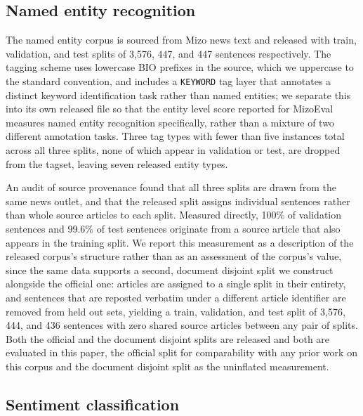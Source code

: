 \documentclass[pdflatex,sn-mathphys-ay]{sn-jnl}
\begin{document}
\subsection{Named entity recognition}
\label{sec:ner-data}

The named entity corpus is sourced from Mizo news text and released with train, validation, and test splits of 3,576, 447, and 447 sentences respectively. The tagging scheme uses lowercase BIO prefixes in the source, which we uppercase to the standard convention, and includes a \texttt{KEYWORD} tag layer that annotates a distinct keyword identification task rather than named entities; we separate this into its own released file so that the entity level score reported for MizoEval measures named entity recognition specifically, rather than a mixture of two different annotation tasks. Three tag types with fewer than five instances total across all three splits, none of which appear in validation or test, are dropped from the tagset, leaving seven released entity types.

An audit of source provenance found that all three splits are drawn from the same news outlet, and that the released split assigns individual sentences rather than whole source articles to each split. Measured directly, 100\% of validation sentences and 99.6\% of test sentences originate from a source article that also appears in the training split. We report this measurement as a description of the released corpus's structure rather than as an assessment of the corpus's value, since the same data supports a second, document disjoint split we construct alongside the official one: articles are assigned to a single split in their entirety, and sentences that are reposted verbatim under a different article identifier are removed from held out sets, yielding a train, validation, and test split of 3,576, 444, and 436 sentences with zero shared source articles between any pair of splits. Both the official and the document disjoint splits are released and both are evaluated in this paper, the official split for comparability with any prior work on this corpus and the document disjoint split as the uninflated measurement.

\subsection{Sentiment classification}
\label{sec:sentiment-data}
\end{document}
